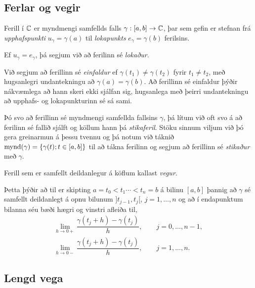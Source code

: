 \subsection*{Ferlar og vegir}


Ferill í  ${\mathbb C}$ er myndmengi samfellds falls $\gamma:[a,b]\to {\mathbb C}$, þar
sem gefin er stefnan frá {\it
upphafspunkti} $u_\gamma=\gamma(a)$
til {\it lokapunkts} $e_\gamma=\gamma(b)$ ferilsins.  

Ef $u_\gamma=e_\gamma$, þá segjum við að ferilinn sé {\it
lokaður}. 

Við
segjum að ferillinn sé {\it einfaldur}  ef
$\gamma(t_1)\neq \gamma(t_2)$ fyrir $t_1\neq t_2$, með hugsanlegri
undantekningu að $\gamma(a)=\gamma(b)$.   Að ferillinn sé einfaldur
þýðir nákvæmlega að hann skeri ekki sjálfan sig, hugsanlega með þeirri
undantekningu að upphafs- og lokapunkturinn sé sá sami. 


Þó svo að
ferillinn sé myndmengi samfellda fallsins $\gamma$, þá lítum við
oft svo á að ferilinn sé fallið sjálft og köllum hann þá {\it
stikaferil}.    Stöku sinnum viljum við þó
gera greinarmun á þessu tvennu og þá notum við táknið 
${{\operatorname{mynd}(\gamma)}}={\{\gamma(t); t\in [a,b]\}}$ til að
tákna ferilinn og segjum að ferillinn sé {\it stikaður} með 
$\gamma$. 


\noindent
Ferill sem er samfellt deildanlegur á köflum kallast {\it
vegur}.

Þetta þýðir að til er skipting $a=t_0<t_1\cdots<t_n=b$ á bilinu
$[a,b]$ þannig að $\gamma$ sé samfellt deildanlegt á opnu bilunum
$]t_{j-1},t_j[$, $j=1,\dots, n$ og að í endapunktum bilanna séu bæði
hægri og vinstri afleiða til,
\begin{gather*}
\lim_{h\to 0+}\dfrac{\gamma(t_j+h)-\gamma(t_j)}h, \qquad
j=0,\dots,n-1,\\ 
\lim_{h\to 0-}\dfrac{\gamma(t_j+h)-\gamma(t_j)}h, \qquad
j=1,\dots,n.
\end{gather*}

\subsection*{Lengd vega}


